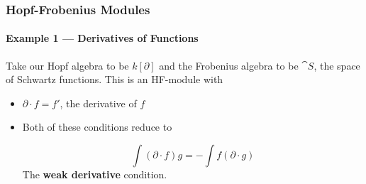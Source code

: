 \documentclass{beamer}
\begin{document}
\begin{frame}

\frametitle{Hopf-Frobenius Modules}
\framesubtitle{Example 1 --- Derivatives of Functions}


Take our Hopf algebra to be $k[\partial]$ and the Frobenius algebra to be $\cat{S}$, the space of Schwartz functions. This is an HF-module with

\bigskip

\begin{itemize}

\item {} $\partial \cdot f = f'$, the derivative of $f$


\medskip

\item {} Both of these conditions reduce to

\begin{equation*}
\int (\partial \cdot f) g  = - \int f (\partial \cdot g)
\end{equation*}
The \textbf{weak derivative} condition.
%
\end{itemize}


\end{frame}
\end{document}
